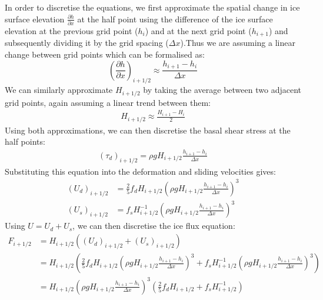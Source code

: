 \documentclass{article}
\begin{document}
In order to discretise the equations, we first approximate the spatial change in ice surface elevation  $\frac{\partial h}{\partial x}$ at the half point using the difference of the ice surface elevation at the previous grid point ($h_i$) and at the next grid point ($h_{i+1}$) and subsequently dividing it by the grid spacing ($\Delta x$).Thus we are assuming a linear change between grid points which can be formalised as:
\begin{equation*}
    \left( \frac{\partial h}{\partial x} \right)_{i+1/2} \approx \frac{h_{i+1} - h_i}{\Delta x}
\end{equation*}
We can similarly approximate $H_{i+1/2}$ by taking the average between two adjacent grid points, again assuming a linear trend between them:
\begin{align*}
    H_{i +1/2} \approx \frac{H_{i+1} - H_i}{2}
\end{align*}
Using both approximations, we can then discretise the basal shear stress at the half points:
\begin{align*}
    \left( \tau_d \right)_{i + 1/2} = \rho g H_{i+1/2} \frac{h_{i+1} - h_i}{\Delta x}
\end{align*}
Substituting this equation into the deformation and sliding velocities gives:
\begin{align*}
    \left( U_d \right)_{i+1/2} &= \frac{2}{5} f_d H_{i+1/2} \left( \rho g H_{i+1/2} \frac{h_{i+1} - h_i}{\Delta x} \right)^3 \\
    \left( U_s \right)_{i+1/2} &= f_s H^{-1}_{i+1/2} \left( \rho g H_{i+1/2} \frac{h_{i+1} - h_i}{\Delta x}  \right)^3  
\end{align*}
Using $U=U_d + U_s$, we can then discretise the ice flux equation:
\begin{align*}
    F_{i+1/2} &= H_{i+1/2} \left( \left( U_d \right)_{i+1/2} + \left( U_s \right)_{i+1/2} \right) \\
    &= H_{i+1/2} \left( \frac{2}{5} f_d H_{i+1/2} \left( \rho g H_{i+1/2} \frac{h_{i+1} - h_i}{\Delta x} \right)^3 + f_s H_{i+1/2}^{-1} \left( \rho g H_{i+1/2} \frac{h_{i+1} - h_i}{\Delta x} \right)^3 \right)\\
    & \boxed{= H_{i+1/2} \left( \rho g H_{i+1/2} \frac{h_{i+1} - h_i}{\Delta x} \right)^3 \left( \frac{2}{5} f_d H_{i+1/2} + f_s H_{i+1/2}^{-1} \right)}
\end{align*}
\end{document}
